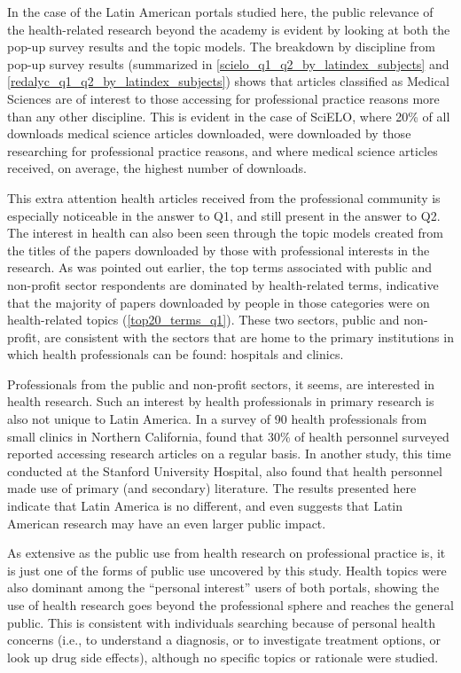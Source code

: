 In the case of the Latin American portals studied here, the public relevance of the health-related research beyond the academy is evident by looking at both the pop-up survey results and the topic models. The breakdown by discipline from pop-up survey results (summarized in \autoref{scielo_q1_q2_by_latindex_subjects} and \autoref{redalyc_q1_q2_by_latindex_subjects}) shows that articles classified as Medical Sciences are of interest to those accessing for professional practice reasons more than any other discipline. This is evident in the case of SciELO, where 20\% of all downloads medical science articles downloaded, were downloaded by those researching for professional practice reasons, and where medical science articles received, on average, the highest number of downloads.

This extra attention health articles received from the professional community is especially noticeable in the answer to Q1, and still present in the answer to Q2. The interest in health can also been seen through the topic models created from the titles of the papers downloaded by those with professional interests in the research. As was pointed out earlier, the top terms associated with public and non-profit sector respondents are dominated by health-related terms, indicative that the majority of papers downloaded by people in those categories were on health-related topics (\autoref{top20_terms_q1}). These two sectors, public and non-profit, are consistent with the sectors that are home to the primary institutions in which health professionals can be found: hospitals and clinics.

Professionals from the public and non-profit sectors, it seems, are interested in health research. Such an interest by health professionals in primary research is also not unique to Latin America. In a survey of 90 health professionals from small clinics in Northern California,  \citet{OKeeffe2011} found that 30\% of health personnel surveyed reported accessing research articles on a regular basis. In another study, this time conducted at the Stanford University Hospital,  \citet{Maggio2013} also found that health personnel made use of primary (and secondary) literature. The results presented here indicate that Latin America is no different, and even suggests that Latin American research may have an even larger public impact.

As extensive as the public use from health research on professional practice is, it is just one of the forms of public use uncovered by this study. Health topics were also dominant among the ``personal interest'' users of both portals, showing the use of health research goes beyond the professional sphere and reaches the general public. This is consistent with individuals searching because of personal health concerns (i.e., to understand a diagnosis, or to investigate treatment options, or look up drug side effects), although no specific topics or rationale were studied.

